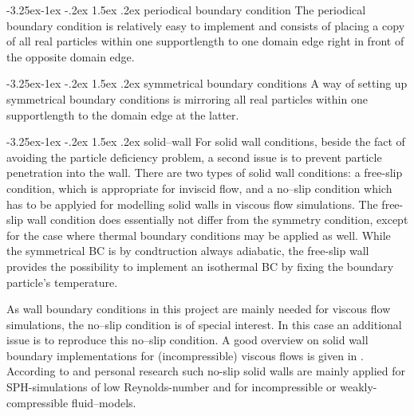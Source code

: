 \documentclass{report}
\makeatletter
\renewcommand\paragraph{\@startsection{paragraph}{4}{\z@}%
  {-3.25ex\@plus -1ex \@minus -.2ex}%
  {1.5ex \@plus .2ex}%
  {\normalfont\normalsize\bfseries}}
\makeatother
\begin{document}
\paragraph{periodical boundary condition}
The periodical boundary condition is relatively easy to implement and consists of placing a copy of all real particles within one supportlength to one domain edge right in front of the opposite domain edge.



\paragraph{symmetrical boundary conditions}
A way of setting up symmetrical boundary conditions is mirroring all real particles within one supportlength to the domain edge at the latter.

\paragraph{solid--wall}
For solid wall conditions, beside the fact of avoiding the particle deficiency problem, a second issue is to prevent particle penetration into the wall.
There are two types of solid wall conditions: a free-slip condition, which is appropriate for inviscid flow, and a no--slip condition which has to be applyied for modelling solid walls in viscous flow simulations. The free-slip wall condition does essentially not differ from the symmetry condition, except for the case where thermal boundary conditions may be applied as well. While the symmetrical BC is by condtruction always adiabatic, the free-slip wall provides the possibility to implement an isothermal BC by fixing the boundary particle's temperature.

As wall boundary conditions in this project are mainly needed for viscous flow simulations, the no--slip condition is of special interest. In this case an additional issue is to reproduce this no--slip condition. A good overview on solid wall boundary implementations for (incompressible) viscous flows is given in \cite{Yildiz2009}. 
According to \cite{Yildiz2009} and personal research such no-slip solid walls are mainly applied for SPH-simulations of low Reynolds-number and for incompressible or weakly-compressible fluid--models. 
\end{document}
